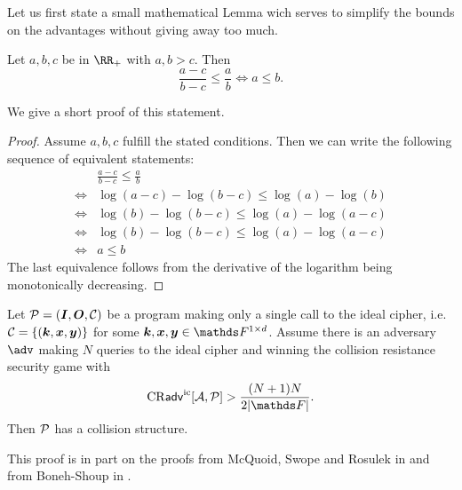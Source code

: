 Let us first state a small mathematical Lemma wich serves to simplify the bounds on the advantages without giving away too much.
\begin{lemma}
\label{lemma:fraction_bound}
    Let $a,b,c$ be in $\RR_+$ with $a,b > c$. Then
    \[
    \frac{a-c}{b-c} \leq \frac{a}{b} \iff a \leq b.
    \]
\end{lemma}
We give a short proof of this statement.
\begin{proof}
    Assume $a,b,c$ fulfill the stated conditions.
    Then we can write the following sequence of equivalent statements:
    \begin{align*}
         & \frac{a-c}{b-c} \leq \frac{a}{b} \\
        \iff& \log(a-c) - \log(b-c) \leq \log(a) - \log(b) \\
        \iff& \log(b) - \log(b-c) \leq \log(a) - \log(a-c) \\
        \iff& \log(b) - \log(b-c) \leq \log(a) - \log(a-c) \\
        \iff& a \leq b
    \end{align*}
    The last equivalence follows from the derivative of the logarithm being monotonically decreasing.
\end{proof}

\begin{prop}
\label{prop:single_query_cr_resistance}
    Let $\P = (\I, \O, \C)$ be a program making only a single call to the ideal cipher,
    i.e. $\C = \{ (\vk, \vx, \vy)\}$ for some $\vk, \vx, \vy \in \Frowsp$.
    Assume there is an adversary $\adv$ making $N$ queries to the ideal cipher and winning the collision resistance security game with
    \[
        \cradv{\A, \P} > \frac{(N+1)N}{2|\F|}.
    \]
    Then $\P$ has a collision structure.
\end{prop}

This proof is in part on the proofs from McQuoid, Swope and Rosulek in \cite[Lemma 10]{TCC:McQSwoRos19} and from Boneh-Shoup in \cite[Theorem 8.4 (Davies-Meyer)]{Boneh2015CourseIA}.

